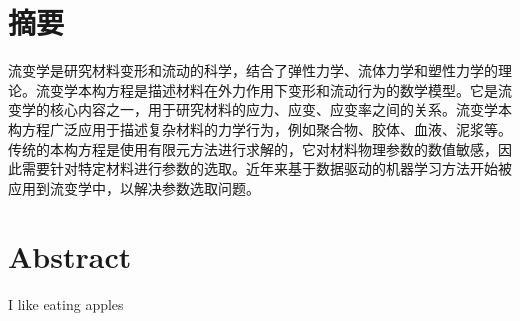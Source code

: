 \chapter{摘\texorpdfstring{\quad}{}要}
流变学是研究材料变形和流动的科学，结合了弹性力学、流体力学和塑性力学的理论。流变学本构方程是描述材料在外力作用下变形和流动行为的数学模型。它是流变学的核心内容之一，用于研究材料的应力、应变、应变率之间的关系。流变学本构方程广泛应用于描述复杂材料的力学行为，例如聚合物、胶体、血液、泥浆等。传统的本构方程是使用有限元方法进行求解的，它对材料物理参数的数值敏感，因此需要针对特定材料进行参数的选取。近年来基于数据驱动的机器学习方法开始被应用到流变学中，以解决参数选取问题。



\chapter{Abstract}
I like eating apples

